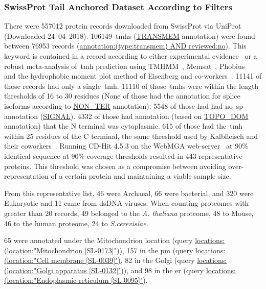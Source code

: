 \subsubsection{SwissProt Tail Anchored Dataset According to Filters}
There were 557012 protein records downloaded from SwissProt via UniProt~\cite{TheUniProtConsortium2014} (Downloaded 24--04--2018).
106149~\gls{tmh}s (\url{TRANSMEM} annotation) were found between 76953 records (\url{annotation:(type:transmem) AND reviewed:no}).
This keyword is contained in a record according to either experimental evidence~\cite{TheUniProtConsortium2014} or a robust meta-analysis of~\gls{tmh} prediction using TMHMM~\cite{Krogh2001}, Memsat~\cite{Jones2007}, Phobius~\cite{Kall2004,Kall2007} and the hydrophobic moment plot method of Eisenberg and co-workers~\cite{Eisenberg1984}.
11141 of those records had only a single~\gls{tmh}.
11110 of those~\gls{tmh}s were within the length thresholds of 16 to 30 residues (None of those had the annotation for splice isoforms according to \url{NON_TER} annotation).
5548 of those had had no~\gls{sp} annotation (\url{SIGNAL}).
4332 of those had annotation (based on \url{TOPO_DOM} annotation) that the N terminal was cytoplasmic.
615 of those had the~\gls{tmh} within 25 residues of the C terminal, the same threshold used by Kalbfleisch and their coworkers~\cite{Kalbfleisch2007}.
Running CD-Hit 4.5.3 on the WebMGA web-server~\cite{Huang2010, Wu2011} at 90\% identical sequence at 90\% coverage thresholds resulted in 443 representative proteins.
This threshold was chosen as a compromise between avoiding over-representation of a certain protein and maintaining a viable sample size.

From this representative list, 46 were Archaeal, 66 were bacterial, and 320 were Eukaryotic and 11 came from dsDNA viruses.
When counting proteomes with greater than 20 records, 49 belonged to the \textit{A. thaliana} proteome, 48 to Mouse, 46 to the human proteome, 24 to \textit{S.cerevisiae}. %

65 were annotated under the Mitochondrion location (query \url{locations:(location:"Mitochondrion [SL-0173]")}), 157 in the \gls{pm} (query \url{locations:(location:"Cell membrane [SL-0039]")}, 82 in the Golgi (query \url{locations:(location:"Golgi apparatus [SL-0132]")}), and 98 in the \gls{er} (query \url{locations:(location:"Endoplasmic reticulum [SL-0095]"}).

